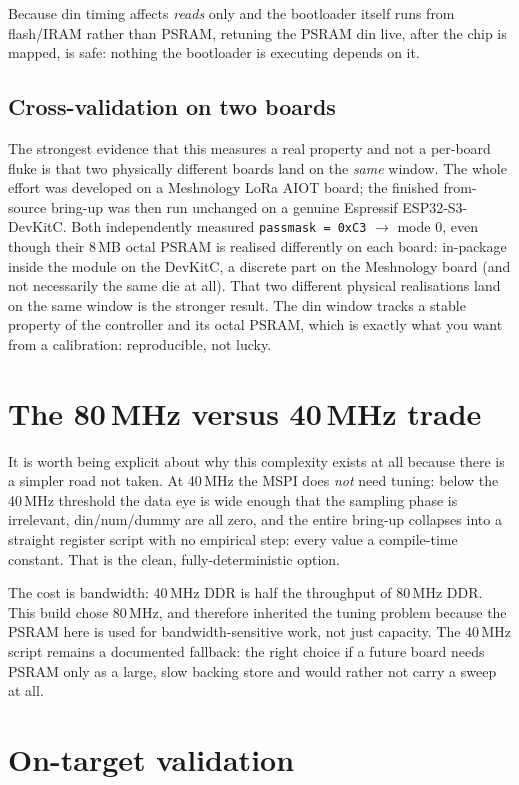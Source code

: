 Because din timing affects \emph{reads} only and the bootloader itself runs from
flash/IRAM rather than PSRAM, retuning the PSRAM din live, after the chip is mapped, is
safe: nothing the bootloader is executing depends on it.

\subsection{Cross-validation on two boards}

The strongest evidence that this measures a real property and not a per-board fluke is
that two physically different boards land on the \emph{same} window. The whole effort
was developed on a Meshnology LoRa AIOT board; the finished from-source bring-up was
then run unchanged on a genuine Espressif ESP32-S3-DevKitC. Both independently measured
\texttt{passmask = 0xC3} $\rightarrow$ mode 0, even though their 8\,MB octal PSRAM is
realised differently on each board: in-package inside the module on the DevKitC, a
discrete part on the Meshnology board (and not necessarily the same die at all). That
two different physical realisations land on the same window is the stronger result. The
din window tracks a stable property of the controller and its octal PSRAM, which is
exactly what you want from a calibration: reproducible, not lucky.

\section{The 80\,MHz versus 40\,MHz trade}

It is worth being explicit about why this complexity exists at all because there is a
simpler road not taken. At 40\,MHz the MSPI does \emph{not} need tuning: below the
40\,MHz threshold the data eye is wide enough that the sampling phase is irrelevant,
din/num/dummy are all zero, and the entire bring-up collapses into a straight register
script with no empirical step: every value a compile-time constant. That is the
clean, fully-deterministic option.

The cost is bandwidth: 40\,MHz DDR is half the throughput of 80\,MHz DDR. This build
chose 80\,MHz, and therefore inherited the tuning problem because the PSRAM here is
used for bandwidth-sensitive work, not just capacity. The 40\,MHz script remains a
documented fallback: the right choice if a future board needs PSRAM only as a large,
slow backing store and would rather not carry a sweep at all.

\section{On-target validation}
\label{ch:psram-validate}

